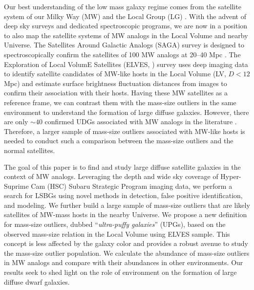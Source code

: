 \documentclass[twocolumn,astrosymb,twocolappendix]{aastex631}
\begin{document}
\begin{CJK*}{UTF8}{gbsn}
Our best understanding of the low mass galaxy regime comes from the satellite system of our Milky Way (MW) and the Local Group (LG) \citep[e.g.,][]{McConnachie2012,Simon2019}. With the advent of deep sky surveys and dedicated spectroscopic programs, we are now in a position to also map the satellite systems of MW analogs in the Local Volume and nearby Universe. The Satellites Around Galactic Analogs (SAGA) survey is designed to spectroscopically confirm the satellites of 100 MW analogs at 20--40 Mpc \citep{SAGA-I,SAGA-II}. The Exploration of Local VolumE Satellites (ELVES,  \citealt{ELVES-I,ELVES-II,CarlstenELVES2022}) survey uses deep imaging data to identify satellite candidates of MW-like hosts in the Local Volume (LV, $D<12$ Mpc) and estimate surface brightness fluctuation distances from images to confirm their association with their hosts. Having these MW satellites as a reference frame, we can contrast them with the mass-size outliers in the same environment to understand the formation of large diffuse galaxies. However, there are only $\sim 40$ confirmed UDGs associated with MW analogs in the literature \citep{Roman2017b,Cohen2018,SAGA-II,CarlstenELVES2022,Karunakaran2022b}. Therefore, a larger sample of mass-size outliers associated with MW-like hosts is needed to conduct such a comparison between the mass-size outliers and the normal satellites.

The goal of this paper is to find and study large diffuse satellite galaxies in the context of MW analogs. Leveraging the depth and wide sky coverage of Hyper-Suprime Cam (HSC) Subaru Strategic Program imaging data, we perform a search for LSBGs using novel methods in detection, false positive identification, and modeling. We further build a large sample of mass-size outliers that are likely satellites of MW-mass hosts in the nearby Universe. We propose a new definition for mass-size outliers, dubbed ``\textit{ultra-puffy galaxies}'' (UPGs), based on the observed mass-size relation in the Local Volume using ELVES sample. This concept is less affected by the galaxy color and provides a robust avenue to study the mass-size outlier population. 
We calculate the abundance of mass-size outliers in MW analogs and compare with their abundances in other environments. Our results seek to shed light on the role of environment on the formation of large diffuse dwarf galaxies. 


\end{CJK*}
\end{document}
